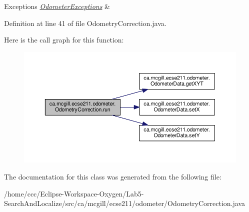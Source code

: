 \begin{DoxyExceptions}{Exceptions}
{\em \hyperlink{classca_1_1mcgill_1_1ecse211_1_1odometer_1_1_odometer_exceptions}{Odometer\+Exceptions}} & \\
\hline
\end{DoxyExceptions}


Definition at line 41 of file Odometry\+Correction.\+java.

Here is the call graph for this function\+:\nopagebreak
\begin{figure}[H]
\begin{center}
\leavevmode
\includegraphics[width=350pt]{classca_1_1mcgill_1_1ecse211_1_1odometer_1_1_odometry_correction_aad66a7030ac00f3a9cbe7bc33c25acbf_cgraph}
\end{center}
\end{figure}


The documentation for this class was generated from the following file\+:\begin{DoxyCompactItemize}
\item 
/home/ccc/\+Eclipse-\/\+Workspace-\/\+Oxygen/\+Lab5-\/\+Search\+And\+Localize/src/ca/mcgill/ecse211/odometer/Odometry\+Correction.\+java\end{DoxyCompactItemize}
